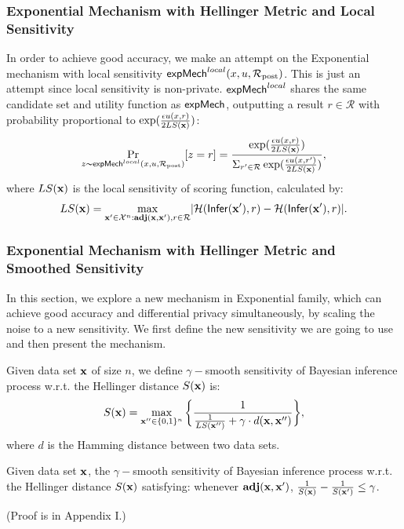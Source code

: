 \documentclass{article}
\begin{document}
\subsubsection{Exponential Mechanism with Hellinger Metric and Local Sensitivity}
\label{subsec_emls}
In order to achieve good accuracy, we make an attempt on the Exponential mechanism with local sensitivity $\mathsf{expMech}^{local}(x,u,\mathcal{R}_{\textup{post}})$. This is just an attempt since local sensitivity is non-private. $\mathsf{expMech}^{local}$ shares the same candidate set and utility function as $\mathsf{expMech}$, outputting a result $r \in \mathcal{R}$ with probability proportional to $\exp(\frac{\epsilon u(x,r)}{2 LS(\textbf{x})})$:
\[
\underset{z \thicksim \mathsf{expMech}^{local}(x,u,\mathcal{R}_{\textup{post}})}{\Pr}[z=r] = \frac
{\exp(\frac{\epsilon u(x,r)}{2 LS(\textbf{x})})}
{\Sigma_{r' \in \mathcal{R}}\exp(\frac{\epsilon u(x,r')}{2 LS(\textbf{x})})},
\]
where $LS(\textbf{x})$ is the local sensitivity of scoring function, calculated by:
\begin{equation}\label{eq:local_sensitivity_scoring}
LS(\textbf{x})=\max_{\textbf{x}' \in \mathcal{X}^n: \\ \textbf{adj}(\textbf{x},\textbf{x}'), r\in \mathcal{R}}\lvert \mathcal{H}(\mathsf{Infer}(\textbf{x}'), r) - \mathcal{H}(\mathsf{Infer}(\textbf{x}'), r)\rvert.
\end{equation}


\subsubsection{Exponential Mechanism with Hellinger Metric and Smoothed Sensitivity}
\label{subsec_hexpmech}
In this section, we explore a new mechanism in Exponential family, which can achieve good accuracy and differential privacy simultaneously, by scaling the noise to a new sensitivity. We first define the new sensitivity we are going to use and then present the mechanism.
\begin{definition}
\label{def_gamma_smooth}
Given data set $\textbf{x}$ of size $n$, we define $\gamma -$smooth sensitivity of Bayesian inference process w.r.t. the Hellinger distance $S(\textbf{x})$ is:
\begin{equation}
  \label{eq_smooth}
   S(\textbf{x})=\max_{\textbf{x}'' \in \{0,1\}^{n}}\bigg \{ \frac{1}{\frac{1}{LS(\textbf{x}'')} +\gamma \cdot d(\textbf{x},\textbf{x}'')} \bigg \},
\end{equation}
where $d$ is the Hamming distance between two data sets.
\end{definition}

\begin{thm}
\label{thm_gamma_smooth}
Given data set $\textbf{x}$, the $\gamma -$smooth sensitivity of Bayesian inference process w.r.t. the Hellinger distance $S(\textbf{x})$ satisfying:%
whenever $\textbf{adj}(\textbf{x},\textbf{x}')$, 
$\frac{1}{S(\textbf{x})} - \frac{1}{S(\textbf{x}')} \leq \gamma$.
\end{thm}
(Proof is in Appendix I.)
\end{document}
